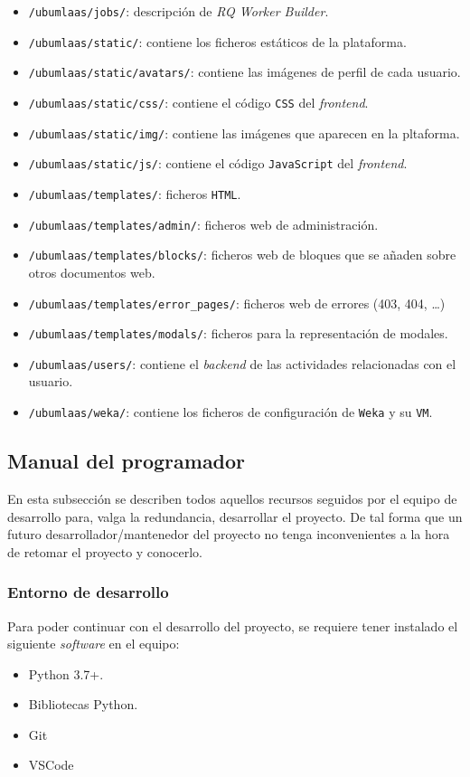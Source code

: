 \begin{itemize}
\item \texttt{/ubumlaas/jobs/}: descripción de \textit{RQ Worker Builder}.
\item \texttt{/ubumlaas/static/}: contiene los ficheros estáticos de la plataforma.
\item \texttt{/ubumlaas/static/avatars/}: contiene las imágenes de perfil de cada usuario.
\item \texttt{/ubumlaas/static/css/}: contiene el código \texttt{CSS} del \textit{frontend}.
\item \texttt{/ubumlaas/static/img/}: contiene las imágenes que aparecen en la pltaforma.
\item \texttt{/ubumlaas/static/js/}: contiene el código \texttt{JavaScript} del \textit{frontend}.
\item \texttt{/ubumlaas/templates/}: ficheros \texttt{HTML}.
\item \texttt{/ubumlaas/templates/admin/}: ficheros web de administración.
\item \texttt{/ubumlaas/templates/blocks/}: ficheros web de bloques que se añaden sobre otros documentos web.
\item \texttt{/ubumlaas/templates/error\_pages/}: ficheros web de errores (403, 404, \dots)
\item \texttt{/ubumlaas/templates/modals/}: ficheros para la representación de modales.
\item \texttt{/ubumlaas/users/}: contiene el \textit{backend} de las actividades relacionadas con el usuario.
\item \texttt{/ubumlaas/weka/}: contiene los ficheros de configuración de \texttt{Weka} y su \texttt{VM}.

\end{itemize}

\subsection{Manual del programador}
En esta subsección se describen todos aquellos recursos seguidos por el equipo de desarrollo para, valga la redundancia, desarrollar el proyecto. De tal forma que un futuro desarrollador/mantenedor del proyecto no tenga inconvenientes a la hora de retomar el proyecto y conocerlo.

\subsubsection{Entorno de desarrollo}
Para poder continuar con el desarrollo del proyecto, se requiere tener instalado el siguiente \textit{software} en el equipo:
\begin{itemize}
\tightlist
\item Python 3.7+.
\item Bibliotecas Python.
\item Git
\item VSCode
\end{itemize}

